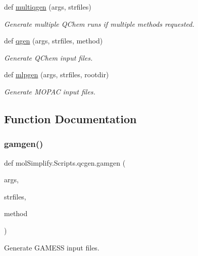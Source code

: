 \begin{DoxyCompactItemize}
def \hyperlink{namespacemolSimplify_1_1Scripts_1_1qcgen_a6b72e45f5e7b20a7cc8516c5cdfa49cc}{multiqgen} (args, strfiles)
\begin{DoxyCompactList}\small\item\em Generate multiple Q\+Chem runs if multiple methods requested. \end{DoxyCompactList}\item 
def \hyperlink{namespacemolSimplify_1_1Scripts_1_1qcgen_ab403afe05d4244607fb8f6999f54135a}{qgen} (args, strfiles, method)
\begin{DoxyCompactList}\small\item\em Generate Q\+Chem input files. \end{DoxyCompactList}\item 
def \hyperlink{namespacemolSimplify_1_1Scripts_1_1qcgen_ade494ee8eea001fdec88ebd6997a3f1b}{mlpgen} (args, strfiles, rootdir)
\begin{DoxyCompactList}\small\item\em Generate M\+O\+P\+AC input files. \end{DoxyCompactList}\end{DoxyCompactItemize}


\subsection{Function Documentation}
\mbox{\label{namespacemolSimplify_1_1Scripts_1_1qcgen_a9669d94c4c797a40526361b957e663ff}} 
\subsubsection{\texorpdfstring{gamgen()}{gamgen()}}
{\footnotesize\ttfamily def mol\+Simplify.\+Scripts.\+qcgen.\+gamgen (\begin{DoxyParamCaption}\item[{}]{args,  }\item[{}]{strfiles,  }\item[{}]{method }\end{DoxyParamCaption})}



Generate G\+A\+M\+E\+SS input files. 


